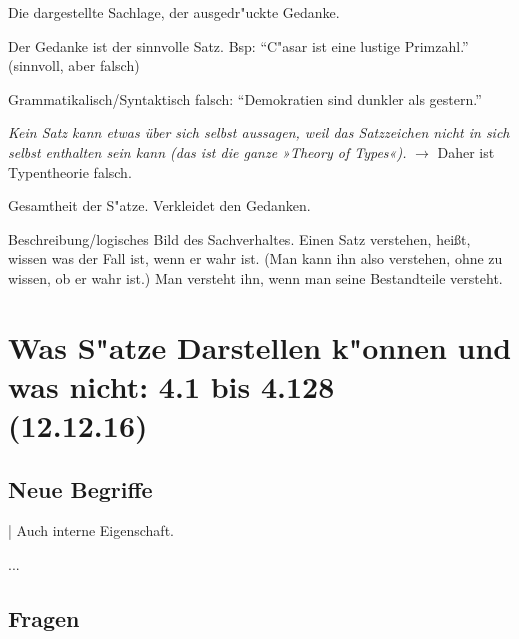 \documentclass[emulatestandardclasses]{scrartcl}
\begin{document}
\begin{description}[leftmargin=!,labelwidth=\widthof{\bfseries Typentheorie}]
  \item[Sinn des Satzes] Die dargestellte Sachlage, der ausgedr"uckte Gedanke.
  \item[Sinnvoll] Der Gedanke ist der sinnvolle Satz. Bsp: "`C"asar ist eine lustige Primzahl."' (sinnvoll, aber falsch)
  \item[Unsinnig] Grammatikalisch/Syntaktisch falsch: "`Demokratien sind dunkler als gestern."'
  \item[Typentheorie] \emph{Kein Satz kann etwas über sich selbst aussagen, weil das Satzzeichen nicht in sich selbst enthalten sein kann (das ist die ganze »Theory of Types«).} $\rightarrow$ Daher ist Typentheorie falsch.
  \item[Sprache] Gesamtheit der S"atze. Verkleidet den Gedanken. 
  \item[Satz] Beschreibung/logisches Bild des Sachverhaltes. Einen Satz verstehen, heißt, wissen was der Fall ist, wenn er wahr ist. (Man kann ihn also verstehen, ohne zu wissen, ob er wahr ist.) Man versteht ihn, wenn man seine Bestandteile versteht.
\end{description}



\section{Was S"atze Darstellen k"onnen und was nicht: 4.1 bis 4.128\\(12.12.16)}

\subsection{Neue Begriffe}

\begin{description}[leftmargin=!,labelwidth=\widthof{\bfseries Sachverhalt}]
  \item[Formale Eigenschaft] | Auch interne Eigenschaft.
  \item[Formaler Begriff] ... 
  \item[Unsagbares] 
\end{description}

\subsection{Fragen}
\end{document}
